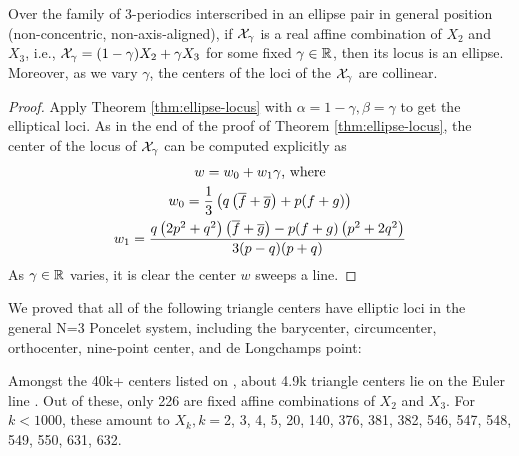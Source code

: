 \begin{corollary}
Over the family of 3-periodics interscribed in an ellipse pair in general position (non-concentric, non-axis-aligned),
if $\mathcal{X}_\gamma$ is a real affine combination of $X_2$ and $X_3$, i.e., $\mathcal{X}_\gamma=(1-\gamma) X_2+\gamma X_3$ for some fixed $\gamma\in\mathbb{R}$, then its locus is an ellipse. Moreover, as we vary $\gamma$, the centers of the loci of the $\mathcal{X}_\gamma$ are collinear.
\end{corollary}

\begin{proof}
Apply Theorem \ref{thm:ellipse-locus} with $\alpha=1-\gamma, \beta=\gamma$ to get the elliptical loci. As in the end of the proof of Theorem \ref{thm:ellipse-locus}, the center of the locus of $\mathcal{X}_\gamma$ can be computed explicitly as 
\begin{gather*}
    w=w_0+w_1 \gamma \text{, where}\\
    w_0=\frac{1}{3} \left(q \left(\overline{f}+\overline{g}\right)+p (f+g)\right)\\
    w_1=\frac{q \left(2 p^2+q^2\right) \left(\overline{f}+\overline{g}\right)-p (f+g) \left(p^2+2 q^2\right)}{3 (p-q) (p+q)}
\end{gather*}
As $\gamma\in\mathbb{R}$ varies, it is clear the center $w$ sweeps a line.
\end{proof}

We proved that all of the following triangle centers have elliptic loci in the general N=3 Poncelet system, including the barycenter, circumcenter, orthocenter, nine-point center, and de Longchamps point:

\begin{observation}
Amongst the 40k+ centers listed on \cite{etc}, about 4.9k triangle centers lie on the Euler line \cite{etc-central-lines}. Out of these, only 226 are fixed affine combinations of $X_2$ and $X_3$. For $k<1000$, these amount to $X_k,k=${\small 2, 3, 4, 5, 20, 140, 376, 381, 382, 546, 547, 548, 549, 550, 631, 
632}.
\label{obs:affine-euler-line}
\end{observation}

